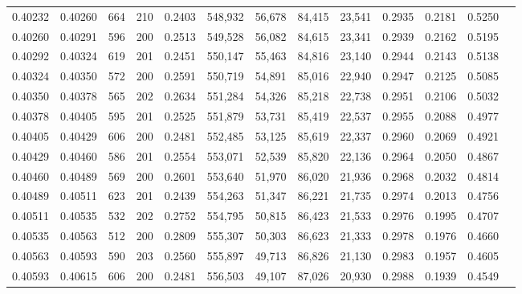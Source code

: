 \begin{tabular}{rrrrrrrrrrrrr}
0.40232 & 0.40260 &   664 & 210 &                                     0.2403 & 548,932 &  56,678 &  84,415 &  23,541 & 0.2935 & 0.2181 & 0.5250 \\
0.40260 & 0.40291 &   596 & 200 &                                     0.2513 & 549,528 &  56,082 &  84,615 &  23,341 & 0.2939 & 0.2162 & 0.5195 \\
0.40292 & 0.40324 &   619 & 201 &                                     0.2451 & 550,147 &  55,463 &  84,816 &  23,140 & 0.2944 & 0.2143 & 0.5138 \\
0.40324 & 0.40350 &   572 & 200 &                                     0.2591 & 550,719 &  54,891 &  85,016 &  22,940 & 0.2947 & 0.2125 & 0.5085 \\
0.40350 & 0.40378 &   565 & 202 &                                     0.2634 & 551,284 &  54,326 &  85,218 &  22,738 & 0.2951 & 0.2106 & 0.5032 \\
0.40378 & 0.40405 &   595 & 201 &                                     0.2525 & 551,879 &  53,731 &  85,419 &  22,537 & 0.2955 & 0.2088 & 0.4977 \\
0.40405 & 0.40429 &   606 & 200 &                                     0.2481 & 552,485 &  53,125 &  85,619 &  22,337 & 0.2960 & 0.2069 & 0.4921 \\
0.40429 & 0.40460 &   586 & 201 &                                     0.2554 & 553,071 &  52,539 &  85,820 &  22,136 & 0.2964 & 0.2050 & 0.4867 \\
0.40460 & 0.40489 &   569 & 200 &                                     0.2601 & 553,640 &  51,970 &  86,020 &  21,936 & 0.2968 & 0.2032 & 0.4814 \\
0.40489 & 0.40511 &   623 & 201 &                                     0.2439 & 554,263 &  51,347 &  86,221 &  21,735 & 0.2974 & 0.2013 & 0.4756 \\
0.40511 & 0.40535 &   532 & 202 &                                     0.2752 & 554,795 &  50,815 &  86,423 &  21,533 & 0.2976 & 0.1995 & 0.4707 \\
0.40535 & 0.40563 &   512 & 200 &                                     0.2809 & 555,307 &  50,303 &  86,623 &  21,333 & 0.2978 & 0.1976 & 0.4660 \\
0.40563 & 0.40593 &   590 & 203 &                                     0.2560 & 555,897 &  49,713 &  86,826 &  21,130 & 0.2983 & 0.1957 & 0.4605 \\
0.40593 & 0.40615 &   606 & 200 &                                     0.2481 & 556,503 &  49,107 &  87,026 &  20,930 & 0.2988 & 0.1939 & 0.4549 \\

\end{tabular}
